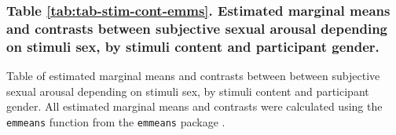 \documentclass[
  bookmarksnumbered]{article}
\begin{document}
\subsubsection{Table \ref{tab:tab-stim-cont-emms}. Estimated marginal means and contrasts between subjective sexual arousal depending on stimuli sex, by stimuli content and participant gender.}\label{table-reftabtab-stim-cont-emms.-estimated-marginal-means-and-contrasts-between-subjective-sexual-arousal-depending-on-stimuli-sex-by-stimuli-content-and-participant-gender.}

Table of estimated marginal means and contrasts between between subjective sexual arousal depending on stimuli sex, by stimuli content and participant gender. All estimated marginal means and contrasts were calculated using the \texttt{emmeans} function from the \texttt{emmeans} package \autocite{emmeanscit}.
\end{document}
